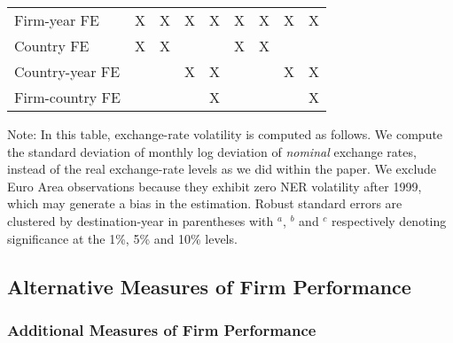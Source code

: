 \documentclass[11pt,twoside, authoryear]{elsarticle}
\begin{document}
\begin{landscape}
\begin{table}[htbp]
\begin{threeparttable}
\begin{tabular}{l*{8}{c}}
\hline
Firm-year FE  & X & X & X & X & X & X & X & X \\
Country FE  & X & X &  &  & X & X &  &  \\
Country-year FE &  &  & X & X &  &  & X & X \\
Firm-country FE &  &  &  & X &  &  &  & X \\
\hline\hline
\end{tabular}
\begin{tablenotes}
\small
\item Note: In this table, exchange-rate volatility is computed as follows. We compute the standard deviation of monthly log deviation of \emph{nominal} exchange rates, instead of the real exchange-rate levels as we did within the paper. We exclude Euro Area observations because they exhibit zero NER volatility after 1999, which may generate a bias in the estimation. Robust standard errors are clustered by destination-year in parentheses with {$^a$}, {$^b$} and {$^c$} respectively denoting significance at the 1\%, 5\% and 10\% levels.
\end{tablenotes}
\end{threeparttable}
\end{table}

\end{landscape}








%
%
%
%
%			
%			
%					
%
%
%
%









\subsection{Alternative Measures of Firm Performance \label{secoa:firmperformance}}
\setcounter{table}{0}
\renewcommand{\thetable}{B.\arabic{table}}


\subsubsection{Additional Measures of Firm Performance}
\end{document}

